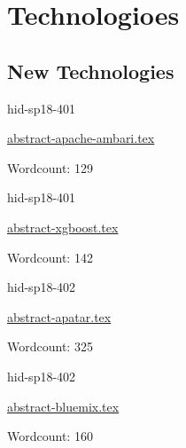 \part{Technologioes}
\chapter{New Technologies}


\begin{IU}

hid-sp18-401

\href{https://github.com/cloudmesh-community/hid-sp18-401/blob/master//technology/abstract-apache-ambari.tex}{abstract-apache-ambari.tex}

 

Wordcount: 129

\end{IU}



\begin{IU}

hid-sp18-401

\href{https://github.com/cloudmesh-community/hid-sp18-401/blob/master//technology/abstract-xgboost.tex}{abstract-xgboost.tex}

 

Wordcount: 142

\end{IU}



\begin{IU}

hid-sp18-402

\href{https://github.com/cloudmesh-community/hid-sp18-402/blob/master//technology/abstract-apatar.tex}{abstract-apatar.tex}

 

Wordcount: 325

\end{IU}



\begin{IU}

hid-sp18-402

\href{https://github.com/cloudmesh-community/hid-sp18-402/blob/master//technology/abstract-bluemix.tex}{abstract-bluemix.tex}

 

Wordcount: 160

\end{IU}

